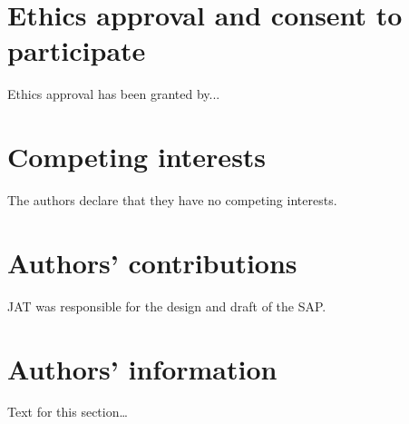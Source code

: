 \documentclass{bmcart}
\begin{document}
\begin{backmatter}
\section*{Ethics approval and consent to participate}%
Ethics approval has been granted by...

\section*{Competing interests}
The authors declare that they have no competing interests.

\section*{Authors' contributions}
JAT was responsible for the design and draft of the SAP.

\section*{Authors' information}%
Text for this section\ldots





\end{backmatter}
\end{document}

